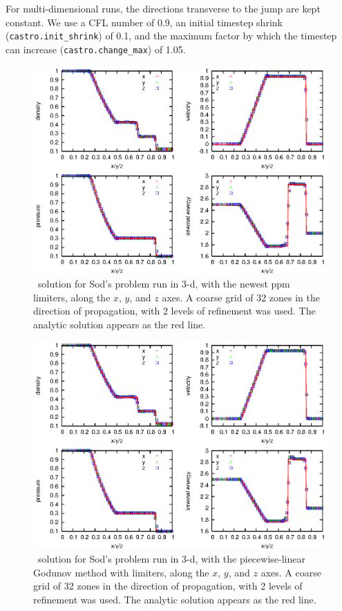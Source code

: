 For multi-dimensional runs, the directions transverse to the jump are
kept constant.  We use a CFL number of 0.9, an initial timestep shrink
({\tt castro.init\_shrink}) of 0.1, and the maximum factor by which
the timestep can increase ({\tt castro.change\_max}) of 1.05.
\begin{figure}[h]
\centering
\includegraphics[width=4.75in]{sod_3d}
\caption{\label{fig:sod} \castro\ solution for Sod's problem run in 3-d,
  with the newest ppm limiters, 
  along the $x$, $y$, and $z$ axes.  A coarse grid of 32 zones in the
  direction of propagation, with 2 levels of refinement was used.  The
  analytic solution appears as the red line.}
\end{figure}
\begin{figure}[h]
\centering
\includegraphics[width=4.75in]{sod_3d_ppm0}
\caption{\label{fig:sod_ppm0} \castro\ solution for Sod's problem run in 3-d,
  with the piecewise-linear Godunov method with limiters,
  along the $x$, $y$, and $z$ axes.  A coarse grid of 32 zones in the
  direction of propagation, with 2 levels of refinement was used.  The
  analytic solution appears as the red line.}
\end{figure}

